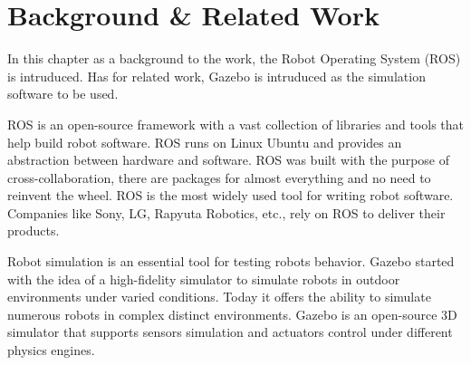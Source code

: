 \chapter{Background \& Related Work}
\label{chap:background}

In this chapter as a background to the work, 
the Robot Operating System (ROS) is intruduced.
Has for related work, Gazebo is intruduced as the simulation software to be used.

\par

ROS is an open-source framework with a vast collection 
of libraries and tools that help build robot software. 
ROS runs on Linux Ubuntu and provides an abstraction between hardware and software.
ROS was built with the purpose of cross-collaboration, there are
packages for almost everything and no need to reinvent the wheel.
ROS is the most widely used tool for writing robot software.
Companies like Sony, LG, Rapyuta Robotics, etc., rely on ROS to deliver their products.

\par

Robot simulation is an essential tool for testing robots behavior. 
Gazebo started with the idea of a high-fidelity simulator to simulate 
robots in outdoor environments under varied conditions.
Today it offers the ability to simulate numerous robots in complex distinct environments.
Gazebo is an open-source 3D simulator that supports sensors simulation 
and actuators control under different physics engines.

